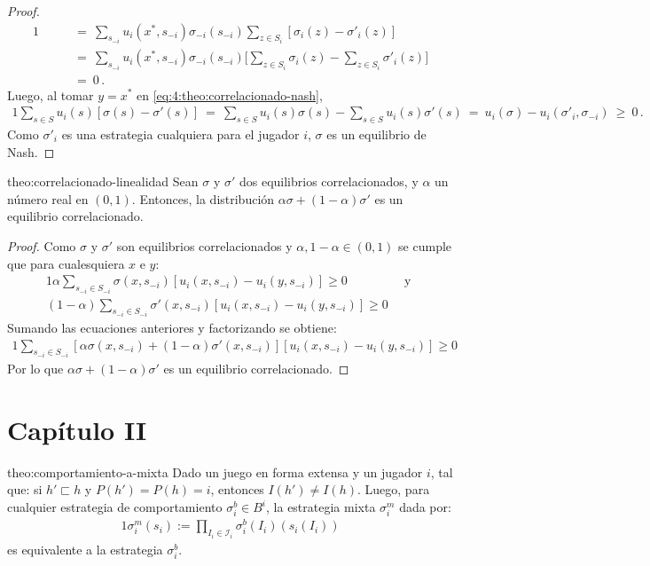\begin{proof}
\begin{alignat}{1}
    &\qquad=\ \sum_{s_{-i}} u_i(x^*,s_{-i}) \sigma_{-i}(s_{-i}) \sum_{z\in S_i} [\sigma_i(z) - \sigma'_i(z)] \\
    &\qquad=\ \sum_{s_{-i}} u_i(x^*,s_{-i}) \sigma_{-i}(s_{-i}) \biggl[ \sum_{z\in S_i} \sigma_i(z) - \sum_{z\in S_i} \sigma'_i(z) \biggr] \\
    &\qquad=\ 0 \,.
\end{alignat}
Luego, al tomar $y=x^*$ en \eqref{eq:4:theo:correlacionado-nash},
\begin{alignat}{1}
 \sum_{s \in S} u_i(s) [\sigma(s) - \sigma'(s)]\ =\ \sum_{s \in S} u_i(s)\sigma(s) - \sum_{s \in S} u_i(s)\sigma'(s)\ =\ u_i(\sigma) - u_i(\sigma'_i, \sigma_{-i})\ \geq\ 0 \,.
\end{alignat}
Como $\sigma'_i$ es una estrategia cualquiera para el jugador $i$, $\sigma$ es un equilibrio de Nash.
\end{proof}

\begin{reptheorem}{theo:correlacionado-linealidad}
Sean $\sigma$ y $\sigma'$ dos equilibrios correlacionados, y $\alpha$ un número real en $(0,1)$. Entonces, la distribución $\alpha\sigma + (1-\alpha)\sigma'$ es un equilibrio correlacionado.
\end{reptheorem}

\begin{proof}
Como $\sigma$ y $\sigma'$ son equilibrios correlacionados y $\alpha, 1 - \alpha \in (0, 1)$ se cumple que para cualesquiera $x$ e $y$:
\begin{alignat}{1}
 \alpha \sum_{s_{-i} \in S_{-i}} \sigma(x, s_{-i})[u_i(x, s_{-i}) - u_i(y, s_{-i})] \geq 0 & \, \text{ y } \\
 (1 - \alpha) \sum_{s_{-i} \in S_{-i}} \sigma'(x, s_{-i})[u_i(x, s_{-i}) - u_i(y, s_{-i})] \geq 0
\end{alignat}
Sumando las ecuaciones anteriores y factorizando se obtiene:
\begin{alignat}{1}
 \sum _{s_{-i} \in S_{-i}} [ \alpha \sigma(x, s_{-i}) +  (1 - \alpha) \sigma'(x, s_{-i})][u_i(x, s_{-i}) - u_i(y, s_{-i})] \geq 0
\end{alignat}
Por lo que $\alpha \sigma +  (1 - \alpha) \sigma'$ es un equilibrio correlacionado.
\end{proof}

\section*{Capítulo II}

\begin{reptheorem}{theo:comportamiento-a-mixta}
Dado un juego en forma extensa y un jugador $i$, tal que: si $h' \sqsubset h$ y $P(h') = P(h) = i$, entonces $I(h') \neq I(h)$. Luego, para cualquier estrategia de comportamiento $\sigma^b_i \in B^i$, la estrategia mixta $\sigma^m_i$ dada por:
\begin{alignat}{1}
\sigma^m_i(s_i) := \prod_{I_i \in \mathcal{I}_i} \sigma^b_i(I_i)(s_i(I_i)) \label{eq-apex:comportamiento-a-mixta}
\end{alignat}
es equivalente a la estrategia $\sigma^b_i$.
\end{reptheorem}

